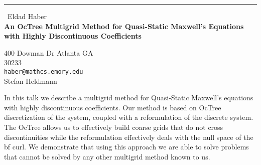 \documentclass{report}
\begin{document}
\begin{center}
\rule{6in}{1pt} \
{\large Eldad Haber \\
{\bf An OcTree Multigrid Method for Quasi-Static Maxwell's Equations with Highly Discontinuous Coefficients}}

400 Dowman Dr Atlanta GA \\ 30233
\\
{\tt haber@mathcs.emory.edu}\\
Stefan Heldmann\end{center}

In this talk we describe a multigrid method for Quasi-Static
Maxwell's equations with highly discontinuous coefficients.
Our method is based on OcTree discretization of the system,
coupled with a reformulation of the discrete system.
The OcTree allows us to effectively build coarse grids
that do not cross discontinuities while the reformulation
effectively deals with the null space of the
bf curl. We demonstrate that using this approach we are able
to solve problems that cannot be solved by any other multigrid
method known to us.
\end{document}
